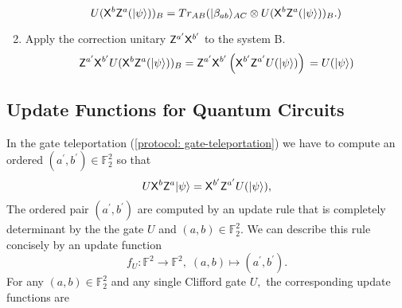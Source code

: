 \begin{algorithm}[H]
\begin{enumerate}
\begin{equation}
U( {\sf X}^b {\sf Z}^a( {\lvert}\psi\rangle))_B=Tr_{AB}({\lvert}\beta_{ab}\rangle_{AC}\otimes U( {\sf X}^b {\sf Z}^a( {\lvert}\psi\rangle))_B.)
 \end{equation}
\item Apply the correction unitary ${\sf Z}^{a^\prime}  {\sf X}^{b^\prime}$ to the system B.
 \begin{equation}
  \label{eq:telepprtation5}
  {\sf Z}^{a^\prime}  {\sf X}^{b^\prime} U( {\sf X}^b {\sf Z}^a( {\lvert}\psi\rangle))_B={\sf Z}^{a^\prime}  {\sf X}^{b^\prime} \left({\sf X}^{b^\prime} {\sf Z}^{a^\prime} U( {\lvert}\psi\rangle)\right)\\
  =U( {\lvert}\psi\rangle)
   \end{equation}
\end{enumerate}	
\end{algorithm}	

\subsection{Update Functions for Quantum Circuits}
\label{update function}
In the gate teleportation (\ref{protocol: gate-teleportation}) we have to compute an ordered $(a^\prime, b^\prime)\in\mathbb{F}_2^2$ so that
\begin{equation*}
U{\sf X}^b{\sf Z}^a {\lvert}\psi\rangle={\sf X}^{b^\prime}{\sf Z}^{a^\prime}U({\lvert}\psi\rangle),  
\end{equation*}
The ordered pair $(a^\prime, b^\prime)$ are computed by an update rule that is completely determinant by the the gate $U$ and $(a,b)\in\mathbb{F}_2^2.$ We can describe this rule concisely by an update function 
\begin{equation*}
f_U:\mathbb{F}^2\rightarrow \mathbb{F}^2, \; (a,b)\mapsto (a^\prime,b^\prime).
\end{equation*}
For any $(a,b)\in\mathbb{F}_2^2$ and any single Clifford gate $U,$ the corresponding update functions are

